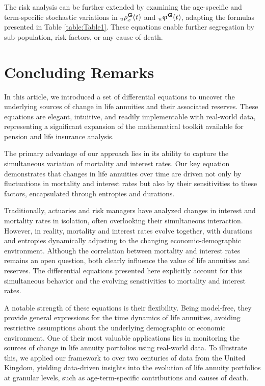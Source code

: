 \documentclass[12pt]{article}
\begin{document}
{The risk analysis can be further extended by examining the age-specific and term-specific stochastic variations in \( {}_u{\rho}^{\bf{G}}_x(t) \) and \( {}_u{\upvarphi}^{\bf{G}}(t) \), adapting the formulas presented in Table \ref{table:Table1}. These equations enable further segregation by sub-population, risk factors, or any cause of death.



\section{Concluding Remarks}\label{sec:6_Conclusion}

In this article, we introduced a set of differential equations to uncover the underlying sources of change in life annuities and their associated reserves. These equations are elegant, intuitive, and readily implementable with real-world data, representing a significant expansion of the mathematical toolkit available for pension and life insurance analysis.

The primary advantage of our approach lies in its ability to capture the simultaneous variation of mortality and interest rates. Our key equation demonstrates that changes in life annuities over time are driven not only by fluctuations in mortality and interest rates but also by their sensitivities to these factors, encapsulated through entropies and durations.

Traditionally, actuaries and risk managers have analyzed changes in interest and mortality rates in isolation, often overlooking their simultaneous interaction. However, in reality, mortality and interest rates evolve together, with durations and entropies dynamically adjusting to the changing economic-demographic environment. Although the correlation between mortality and interest rates remains an open question, both clearly influence the value of life annuities and reserves. The differential equations presented here explicitly account for this simultaneous behavior and the evolving sensitivities to mortality and interest rates.

A notable strength of these equations is their flexibility. Being model-free, they provide general expressions for the time dynamics of life annuities, avoiding restrictive assumptions about the underlying demographic or economic environment. One of their most valuable applications lies in monitoring the sources of change in life annuity portfolios using real-world data. To illustrate this, we applied our framework to over two centuries of data from the United Kingdom, yielding data-driven insights into the evolution of life annuity portfolios at granular levels, such as age-term-specific contributions and causes of death.


}
\end{document}

